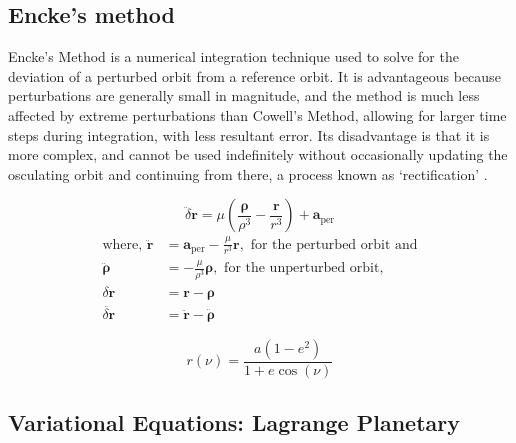 \subsection{Encke's method}

Encke's Method is a numerical integration technique used to solve for the deviation of a perturbed orbit from a reference orbit. It is advantageous because perturbations are generally small in magnitude, and the method is much less affected by extreme perturbations than Cowell's Method, allowing for larger time steps during integration, with less resultant error.  Its disadvantage is that it is more complex, and cannot be used indefinitely without occasionally updating the osculating orbit and continuing from there, a process known as `rectification' \cite{Wakker2015}.

\begin{equation}
    \ddot{\delta} \mathbf{r}=\mu\left(\frac{\boldsymbol{\rho}}{\rho^3}-\frac{\mathbf{r}}{r^3}\right)+\mathbf{a}_{\mathrm{per}}
\end{equation}
\begin{equation*}
    \begin{aligned}
        \text{where, }
        \ddot{\mathbf{r}} &= \mathbf{a}_{\mathrm{per}}-\frac{\mu}{r^3} \mathbf{r}, \text{  for the perturbed orbit and} \\
        \ddot{\boldsymbol{\rho}} &=-\frac{\mu}{\rho^3} \boldsymbol{\rho}, \text{  for the unperturbed orbit,} \\
        \delta \mathbf{r} &= \mathbf{r}-\boldsymbol{\rho} \\
        \ddot{\delta \mathbf{r}} &= \ddot{\mathbf{r}}-\ddot{\boldsymbol{\rho}}
    \end{aligned}
\end{equation*}

\begin{equation}
    r(\nu)=\frac{a\left(1-e^2\right)}{1+e \cos (\nu)}
\end{equation}

\subsection{Variational Equations: Lagrange Planetary}

